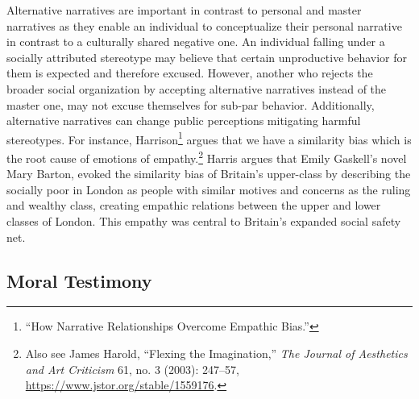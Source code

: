 \documentclass[phdthesis,12pt,final,a4paper]{wuthesis}
\theoremstyle{definition}
\theoremstyle{definition}
\theoremstyle{definition}
\theoremstyle{definition}
\theoremstyle{remark}
\begin{document}
Alternative narratives are important in contrast to personal and master narratives as they enable an individual to conceptualize their personal narrative in contrast to a culturally shared negative one. An individual falling under a socially attributed stereotype may believe that certain unproductive behavior for them is expected and therefore excused. However, another who rejects the broader social organization by accepting alternative narratives instead of the master one, may not excuse themselves for sub-par behavior. Additionally, alternative narratives can change public perceptions mitigating harmful stereotypes. For instance, Harrison\footnote{{``How {Narrative Relationships Overcome Empathic Bias}.''}} argues that we have a similarity bias which is the root cause of emotions of empathy.\footnote{Also see James Harold, {``Flexing the {Imagination},''} \emph{The Journal of Aesthetics and Art Criticism} 61, no. 3 (2003): 247--57, \url{https://www.jstor.org/stable/1559176}.} Harris argues that Emily Gaskell's novel Mary Barton, evoked the similarity bias of Britain's upper-class by describing the socially poor in London as people with similar motives and concerns as the ruling and wealthy class, creating empathic relations between the upper and lower classes of London. This empathy was central to Britain's expanded social safety net.

\subsection*{Moral Testimony}\label{moral-testimony}
\end{document}
